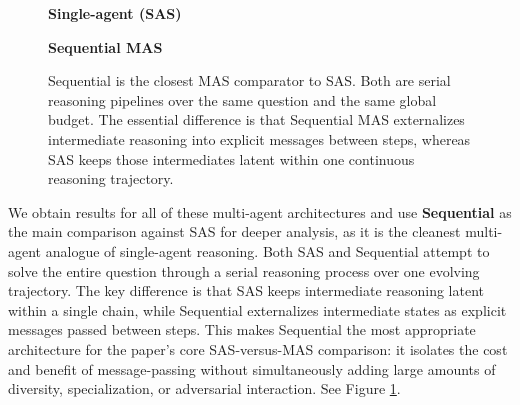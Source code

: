 \documentclass{article} %
\begin{document}
\begin{figure}[h]
\centering
\setlength{\fboxsep}{6pt}
\small
\begin{minipage}[t]{0.47\linewidth}
\centering
\textbf{Single-agent (SAS)}\\[3pt]
\end{minipage}
\hfill
\begin{minipage}[t]{0.47\linewidth}
\centering
\textbf{Sequential MAS}\\[3pt]
\end{minipage}
\caption{Sequential is the closest MAS comparator to SAS. Both are serial reasoning pipelines over the same question and the same global budget. The essential difference is that Sequential MAS externalizes intermediate reasoning into explicit messages between steps, whereas SAS keeps those intermediates latent within one continuous reasoning trajectory.}
\label{fig:sas-vs-seq}
\end{figure}

We obtain results for all of these multi-agent architectures and use \textbf{Sequential} as the main comparison against SAS for deeper analysis, as it is the cleanest multi-agent analogue of single-agent reasoning. Both SAS and Sequential attempt to solve the entire question through a serial reasoning process over one evolving trajectory. The key difference is that SAS keeps intermediate reasoning latent within a single chain, while Sequential externalizes intermediate states as explicit messages passed between steps. This makes Sequential the most appropriate architecture for the paper's core SAS-versus-MAS comparison: it isolates the cost and benefit of message-passing without simultaneously adding large amounts of diversity, specialization, or adversarial interaction. See Figure \ref{fig:sas-vs-seq}.
\end{document}

